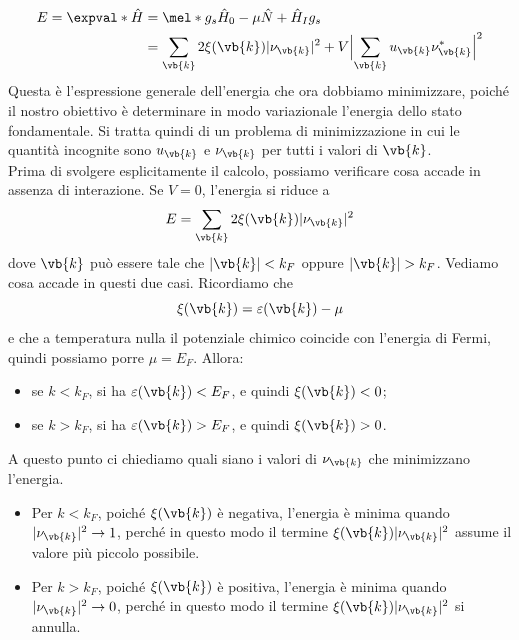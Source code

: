\begin{equation}
   \begin{split}
      E
      =\expval*{\hat{H}}
      & =\mel*{g_s}{\hat{H}_0 - \mu \hat{N} + \hat{H}_I}{g_s}
      \\
      & =\sum_{\vb{k}} 2 \xi(\vb{k}) |\nu_{\vb{k}}|^2
      + V \Bigl| \sum_{\vb{k}} u_{\vb{k}} \nu^*_{\vb{k}} \Bigr|^2
   \end{split}
   \label{eq:BCS_energy}
\end{equation}
Questa è l'espressione generale dell'energia che ora dobbiamo minimizzare, poiché il nostro obiettivo è determinare in modo variazionale l'energia dello stato fondamentale. Si tratta quindi di un problema di minimizzazione in cui le quantità incognite sono $u_{\vb{k}}$ e $\nu_{\vb{k}}$ per tutti i valori di $\vb{k}$.\\
Prima di svolgere esplicitamente il calcolo, possiamo verificare cosa accade in assenza di interazione. Se $V=0$, l'energia si riduce a
\begin{equation*}
   E
   =\sum_{\vb{k}} 2 \xi(\vb{k}) |\nu_{\vb{k}}|^2
\end{equation*}
dove $\vb{k}$ può essere tale che $|\vb{k}|<k_F$ oppure $|\vb{k}|>k_F$. Vediamo cosa accade in questi due casi. Ricordiamo che
\begin{equation*}
   \xi(\vb{k})=\varepsilon(\vb{k}) - \mu
\end{equation*}
e che a temperatura nulla il potenziale chimico coincide con l'energia di Fermi, quindi possiamo porre $\mu=E_F$. Allora:
\begin{itemize}[leftmargin=0.5cm]
   \item se $k < k_F$, si ha $\varepsilon(\vb{k})<E_F$, e quindi $\xi(\vb{k})<0$;
   \item se $k > k_F$, si ha $\varepsilon(\vb{k})>E_F$, e quindi $\xi(\vb{k})>0$.
\end{itemize}
A questo punto ci chiediamo quali siano i valori di $\nu_{\vb{k}}$ che minimizzano l'energia.
\begin{itemize}[leftmargin=0.5cm]
   \item Per $k < k_F$, poiché $\xi(\vb{k})$ è negativa, l'energia è minima quando $|\nu_{\vb{k}}|^2 \to 1$, perché in questo modo il termine $\xi(\vb{k}) |\nu_{\vb{k}}|^2$ assume il valore più piccolo possibile.
   \item Per $k > k_F$, poiché $\xi(\vb{k})$ è positiva, l'energia è minima quando $|\nu_{\vb{k}}|^2 \to 0$, perché in questo modo il termine $\xi(\vb{k}) |\nu_{\vb{k}}|^2$ si annulla.
\end{itemize}
